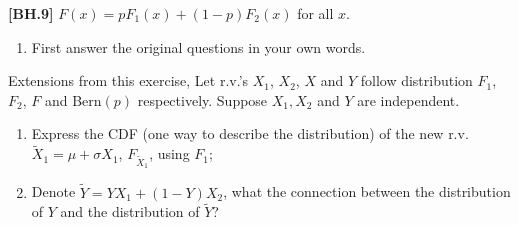 \begin{exercise}
	\textbf{[BH.9]} $F(x) = p F_1(x)+ (1 - p) F_2(x)$ for all $x$.
	\begin{enumerate}
		\item First answer the original questions in your own words.
	\end{enumerate}
Extensions from this exercise, Let r.v.'s $X_1$, $X_2$, $X$ and $Y$ follow distribution $F_1$, $F_2$, $F$ and Bern$(p)$ respectively. Suppose $X_1,X_2$ and $Y$ are independent.
\begin{enumerate}
	\item Express the CDF (one way to describe the distribution) of the new r.v. $\tilde{X}_1=\mu+ \sigma X_1$, $F_{\tilde{X}_1}$, using $F_1$;
	\item Denote $\tilde{Y}=YX_1+(1-Y)X_2$, what the connection between the distribution of $Y$ and the distribution of $\tilde{Y}$?
\end{enumerate}
	
\end{exercise}
